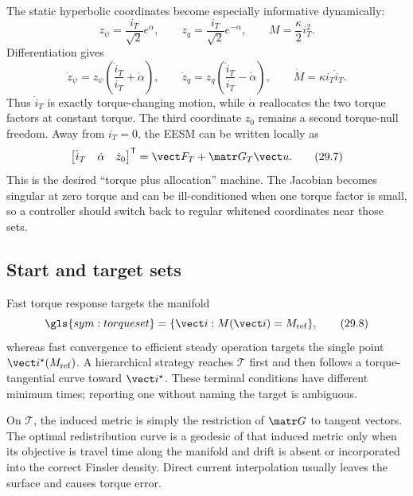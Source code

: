 The static hyperbolic coordinates become especially informative dynamically:
\[
 z_\psi=\frac{i_T}{\sqrt2}e^\alpha,\qquad
 z_q=\frac{i_T}{\sqrt2}e^{-\alpha},\qquad
 M=\frac{\kappa}{2}i_T^2.
 \tag{29.5}
\]
Differentiation gives
\[
 \dot z_\psi=z_\psi\left(\frac{\dot i_T}{i_T}+\dot\alpha\right),
 \qquad
 \dot z_q=z_q\left(\frac{\dot i_T}{i_T}-\dot\alpha\right),
 \qquad
 \dot M=\kappa i_T\dot i_T.
 \tag{29.6}
\]
Thus \(\dot i_T\) is exactly torque-changing motion, while \(\dot\alpha\)
reallocates the two torque factors at constant torque.  The third coordinate
\(z_0\) remains a second torque-null freedom.  Away from \(i_T=0\), the EESM
can be written locally as
\[
 \begin{bmatrix}\dot i_T&\dot\alpha&\dot z_0\end{bmatrix}^{\mathsf T}
 =\vect F_T+\matr G_T\vect u.
 \tag{29.7}
\]
This is the desired ``torque plus allocation'' machine.  The Jacobian becomes
singular at zero torque and can be ill-conditioned when one torque factor is
small, so a controller should switch back to regular whitened coordinates
near those sets.

\subsection{Start and target sets}

Fast torque response targets the manifold
\[
 \gls{sym:torqueset}=\{\vect i:M(\vect i)=M_{\mathrm{ref}}\},
 \tag{29.8}
\]
whereas fast convergence to efficient steady operation targets the single
point \(\vect i^\star(M_{\mathrm{ref}})\).  A hierarchical strategy reaches
\(\mathcal T\) first and then follows a torque-tangential curve toward
\(\vect i^\star\).  These terminal conditions have different minimum times;
reporting one without naming the target is ambiguous.

On \(\mathcal T\), the induced metric is simply the restriction of
\(\matr G\) to tangent vectors.  The optimal redistribution curve is a
geodesic of that induced metric only when its objective is travel time along
the manifold and drift is absent or incorporated into the correct Finsler
density.  Direct current interpolation usually leaves the surface and causes
torque error.

